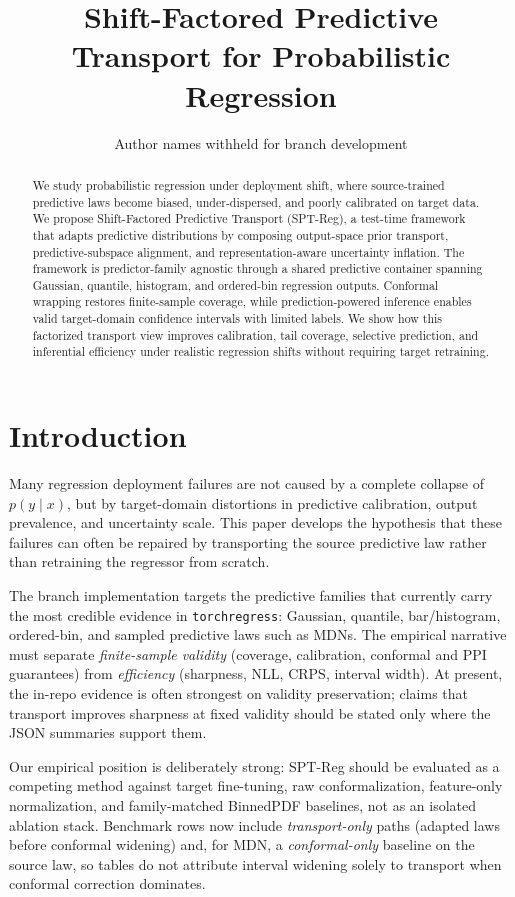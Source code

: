 \documentclass{article}
\title{Shift-Factored Predictive Transport for Probabilistic Regression}
\author{%
  Author names withheld for branch development
}
\begin{document}
\maketitle

\begin{abstract}
We study probabilistic regression under deployment shift, where source-trained
predictive laws become biased, under-dispersed, and poorly calibrated on target
data. We propose Shift-Factored Predictive Transport (SPT-Reg), a test-time
framework that adapts predictive distributions by composing output-space prior
transport, predictive-subspace alignment, and representation-aware uncertainty
inflation. The framework is predictor-family agnostic through a shared
predictive container spanning Gaussian, quantile, histogram, and ordered-bin
regression outputs. Conformal wrapping restores finite-sample coverage, while
prediction-powered inference enables valid target-domain confidence intervals
with limited labels. We show how this factorized transport view improves
calibration, tail coverage, selective prediction, and inferential efficiency
under realistic regression shifts without requiring target retraining.
\end{abstract}

\section{Introduction}

Many regression deployment failures are not caused by a complete collapse of
$p(y \mid x)$, but by target-domain distortions in predictive calibration,
output prevalence, and uncertainty scale. This paper develops the hypothesis
that these failures can often be repaired by transporting the source predictive
law rather than retraining the regressor from scratch.

The branch implementation targets the predictive families that currently carry
the most credible evidence in \texttt{torchregress}: Gaussian, quantile,
bar/histogram, ordered-bin, and sampled predictive laws such as MDNs. The
empirical narrative must separate \emph{finite-sample validity} (coverage,
calibration, conformal and PPI guarantees) from \emph{efficiency} (sharpness,
NLL, CRPS, interval width). At present, the in-repo evidence is often strongest
on validity preservation; claims that transport improves sharpness at fixed
validity should be stated only where the JSON summaries support them.

Our empirical position is deliberately strong: SPT-Reg should be evaluated as a
competing method against target fine-tuning, raw conformalization, feature-only
normalization, and family-matched BinnedPDF baselines, not as an isolated
ablation stack. Benchmark rows now include \emph{transport-only} paths (adapted
laws before conformal widening) and, for MDN, a \emph{conformal-only} baseline
on the source law, so tables do not attribute interval widening solely to
transport when conformal correction dominates.
\end{document}
